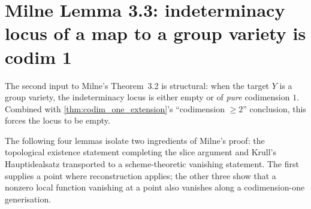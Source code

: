 \section{Milne Lemma 3.3: indeterminacy locus of a map to a group variety is codim 1}
\label{sec:milne_lem33}

The second input to Milne's Theorem~3.2 is structural: when the target \(Y\) is a group
variety, the indeterminacy locus is either empty or of \emph{pure} codimension \(1\).
Combined with \cref{thm:codim_one_extension}'s ``codimension \(\geq 2\)'' conclusion,
this forces the locus to be empty.

The following four lemmas isolate two ingredients of Milne's proof: the
topological existence statement completing the slice argument and Krull's
Hauptidealsatz transported to a scheme-theoretic vanishing statement.  The
first supplies a point where reconstruction applies; the other three show that
a nonzero local function vanishing at a point also vanishes along a
codimension-one generisation.

